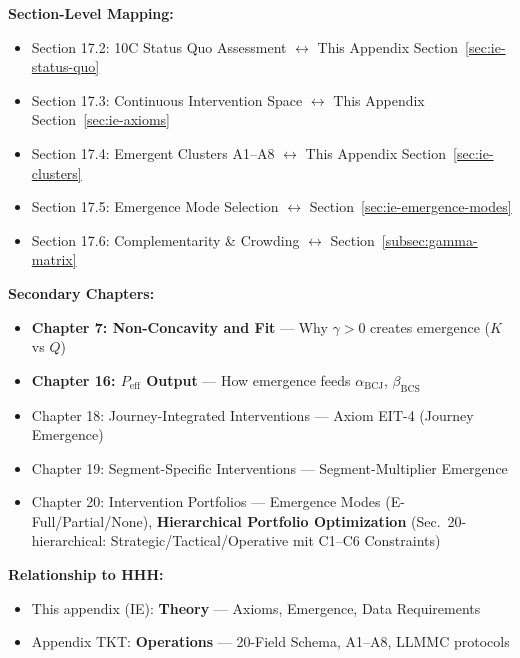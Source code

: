 \begin{tcolorbox}[colback=purple!5!white, colframe=purple!75!black,
    title=Chapter Linkage]
\vspace{0.5em}
\textbf{Section-Level Mapping:}
\begin{itemize}[nosep]
\item Section 17.2: 10C Status Quo Assessment $\leftrightarrow$ This Appendix Section~\ref{sec:ie-status-quo}
\item Section 17.3: Continuous Intervention Space $\leftrightarrow$ This Appendix Section~\ref{sec:ie-axioms}
\item Section 17.4: Emergent Clusters A1--A8 $\leftrightarrow$ This Appendix Section~\ref{sec:ie-clusters}
\item Section 17.5: Emergence Mode Selection $\leftrightarrow$ Section~\ref{sec:ie-emergence-modes}
\item Section 17.6: Complementarity \& Crowding $\leftrightarrow$ Section~\ref{subsec:gamma-matrix}
\end{itemize}

\textbf{Secondary Chapters:}
\begin{itemize}[nosep]
\item \textbf{Chapter 7: Non-Concavity and Fit} --- Why $\gamma > 0$ creates emergence ($K$ vs $Q$)
\item \textbf{Chapter 16: $P_{\text{eff}}$ Output} --- How emergence feeds $\alpha_{\text{BCJ}}$, $\beta_{\text{BCS}}$
\item Chapter 18: Journey-Integrated Interventions --- Axiom EIT-4 (Journey Emergence)
\item Chapter 19: Segment-Specific Interventions --- Segment-Multiplier Emergence
\item Chapter 20: Intervention Portfolios --- Emergence Modes (E-Full/Partial/None), \textbf{Hierarchical Portfolio Optimization} (Sec.\ 20-hierarchical: Strategic/Tactical/Operative mit C1--C6 Constraints)
\end{itemize}

\textbf{Relationship to HHH:}
\begin{itemize}[nosep]
\item This appendix (IE): \textbf{Theory} --- Axioms, Emergence, Data Requirements
\item Appendix TKT: \textbf{Operations} --- 20-Field Schema, A1--A8, LLMMC protocols
\end{itemize}

\end{tcolorbox}


